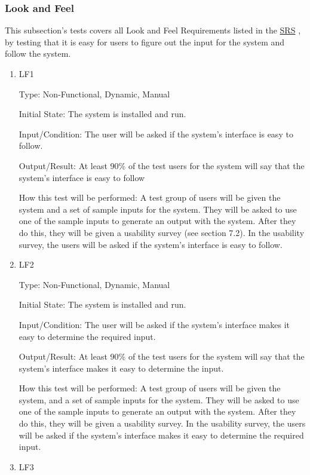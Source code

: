 \documentclass[12pt, titlepage]{article}
\begin{document}
\subsubsection{Look and Feel}
This subsection's tests covers all Look and Feel Requirements listed in the \href{https://github.com/paezha/PyERT-BLACK/blob/main/docs/SRS/SRS.pdf}{SRS} \citep{SRS}, by testing that it is easy for users to figure out the input for the system and follow the system. 

\begin{enumerate}

\item{LF1\\}\label{LF1}

Type: Non-Functional, Dynamic, Manual
					
Initial State: 
The system is installed and run.		

Input/Condition: 
The user will be asked if the system's interface is easy to follow.	

Output/Result: 
At least 90\% of the test users for the system will say that the system's interface is easy to follow
					
How this test will be performed:
A test group of users will be given the system and a set of sample inputs for the system. They will be asked to use one of the sample inputs to generate an output with the system. After they do this, they will be given a usability survey (see section 7.2). In the usability survey, the users will be asked if the system's interface is easy to follow.
\\
\item{LF2\\}\label{LF2}

Type: Non-Functional, Dynamic, Manual
					
Initial State: 
The system is installed and run.

Input/Condition: 
The user will be asked if the system's interface makes it easy to determine the required input.			

Output/Result: 
At least 90\% of the test users for the system will say that the system's interface makes it easy to determine the input.
					
How this test will be performed:
A test group of users will be given the system, and a set of sample inputs for the system. They will be asked to use one of the sample inputs to generate an output with the system. After they do this, they will be given a usability survey. In the usability survey, the users will be asked if the system's interface makes it easy to determine the required input.	
\\
\item{LF3\\}\label{LF3}


\end{enumerate}
\end{document}
